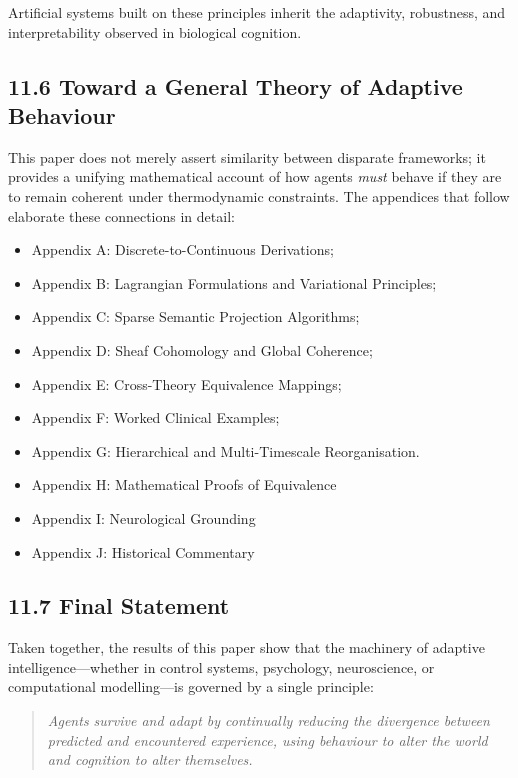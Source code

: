 \documentclass[11pt,a4paper,twoside]{article}
\begin{document}
Artificial systems built on these principles inherit the adaptivity, robustness, and interpretability observed in biological cognition.

\subsection*{11.6 Toward a General Theory of Adaptive Behaviour}

This paper does not merely assert similarity between disparate frameworks; it provides a unifying mathematical account of how agents \emph{must} behave if they are to remain coherent under thermodynamic constraints. The appendices that follow elaborate these connections in detail:

\begin{itemize}
\item Appendix A: Discrete-to-Continuous Derivations;
\item Appendix B: Lagrangian Formulations and Variational Principles;
\item Appendix C: Sparse Semantic Projection Algorithms;
\item Appendix D: Sheaf Cohomology and Global Coherence;
\item Appendix E: Cross-Theory Equivalence Mappings;
\item Appendix F: Worked Clinical Examples;
\item Appendix G: Hierarchical and Multi-Timescale Reorganisation.
\item Appendix H: Mathematical Proofs of Equivalence
\item Appendix I: Neurological Grounding
\item Appendix J: Historical Commentary
\end{itemize}

\subsection*{11.7 Final Statement}

Taken together, the results of this paper show that the machinery of adaptive intelligence---whether in control systems, psychology, neuroscience, or computational modelling---is governed by a single principle:

\begin{quote}
\emph{Agents survive and adapt by continually reducing the divergence between predicted and encountered experience, using behaviour to alter the world and cognition to alter themselves.}
\end{quote}
\end{document}
